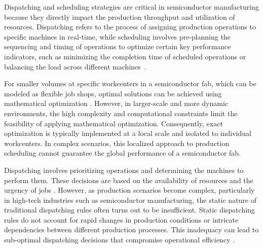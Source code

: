 
Dispatching and scheduling strategies are critical in semiconductor manufacturing because they directly impact the production throughput and utilization of resources. Dispatching refers to the process of assigning production operations to specific machines in real-time, while scheduling involves pre-planning the sequencing and timing of operations to optimize certain key performance indicators, such as minimizing the completion time of scheduled operations or balancing the load across different machines~\cite{schumann2022scheduling}.

For smaller volumes at specific workcenters in a semiconductor fab, which can be modeled as flexible job shops, optimal solutions can be achieved using mathematical optimization \cite{waschneck2018deep}. However, in larger-scale and more dynamic environments, the high complexity and computational constraints limit the feasibility of applying mathematical optimization. Consequently, exact optimization is typically implemented at a local scale and isolated to individual workcenters. In complex scenarios, this localized approach to production scheduling cannot guarantee the global performance of a semiconductor fab.

Dispatching involves prioritizing operations and determining the machines to perform them. These decisions are based on the availability of resources and the urgency of jobs \cite{Hopp2011}. However, as production scenarios become complex, particularly in high-tech industries such as semiconductor manufacturing, the static nature of traditional dispatching rules often turns out to be insufficient. Static dispatching rules do not account for rapid changes in production conditions or intricate dependencies between different production processes.  
This inadequacy can lead to sub-optimal dispatching decisions that compromise operational efficiency \cite{Uzsoy1992}.

